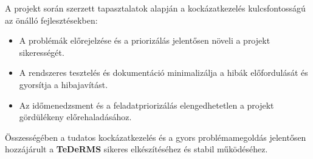A projekt során szerzett tapasztalatok alapján a kockázatkezelés kulcsfontosságú az önálló fejlesztésekben:
\begin{itemize}
    \item A problémák előrejelzése és a priorizálás jelentősen növeli a projekt sikerességét.
    \item A rendszeres tesztelés és dokumentáció minimalizálja a hibák előfordulását és gyorsítja a hibajavítást.
    \item Az időmenedzsment és a feladatpriorizálás elengedhetetlen a projekt gördülékeny előrehaladásához.
\end{itemize}

Összességében a tudatos kockázatkezelés és a gyors problémamegoldás 
jelentősen hozzájárult a \textbf{TeDeRMS} sikeres elkészítéséhez és stabil működéséhez.
